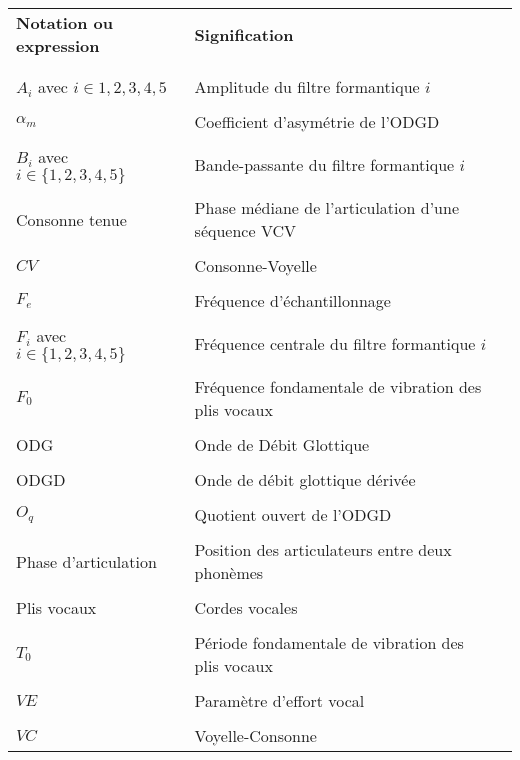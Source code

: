 

\begin{table}[htbp]
\centering
\begin{tabular}{l l l}

\textbf{Notation ou expression} & \textbf{Signification} & \\ \\ %
\hline
\\
$A_i$ avec $i \in {1,2,3,4,5}$ & Amplitude du filtre formantique $i$ & \\  \\

$\alpha_m$ & Coefficient d'asymétrie de l'ODGD& \\  \\

$B_i$ avec $i\in\{1,2,3,4,5\}$ & Bande-passante du filtre formantique $i$ & \\  \\

Consonne tenue & Phase médiane de l'articulation d'une séquence VCV &\\  \\

$CV$ & Consonne-Voyelle &\\  \\

$F_e$ & Fréquence d'échantillonnage & \\  \\

$F_i$ avec $i\in\{1,2,3,4,5\}$ & Fréquence centrale du filtre formantique $i$ & \\  \\

$F_0$ & Fréquence fondamentale de vibration des plis vocaux &\\  \\

ODG & Onde de Débit Glottique &\\  \\

ODGD & Onde de débit glottique dérivée& \\  \\

$O_q$ & Quotient ouvert de l'ODGD&\\  \\

Phase d'articulation & Position des articulateurs entre deux phonèmes & \\  \\

Plis vocaux & Cordes vocales &\\  \\

$T_0$ & Période fondamentale de vibration des plis vocaux &\\  \\

$VE$ & Paramètre d'effort vocal & \\  \\

$VC$ & Voyelle-Consonne &
\end{tabular}
\end{table}
